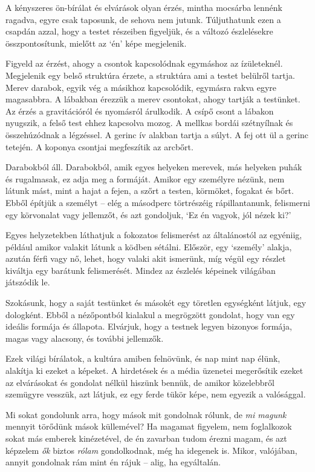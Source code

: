 A kényszeres ön-bírálat és elvárások olyan érzés, mintha mocsárba
lennénk ragadva, egyre csak taposunk, de sehova nem jutunk. Túljuthatunk
ezen a csapdán azzal, hogy a testet részeiben figyeljük, és a változó
észlelésekre összpontosítunk, mielőtt az `én' képe megjelenik.

Figyeld az érzést, ahogy a csontok kapcsolódnak egymáshoz az
ízületeknél. Megjelenik egy belső struktúra érzete, a struktúra ami a
testet belülről tartja. Merev darabok, egyik vég a másikhoz kapcsolódik,
egymásra rakva egyre magasabbra. A lábakban érezzük a merev csontokat,
ahogy tartják a testünket. Az érzés a gravitációról és nyomásról
árulkodik. A csípő csont a lábakon nyugszik, a felső test ehhez
kapcsolva mozog. A mellkas bordái szétnyílnak és összehúzódnak a
légzéssel. A gerinc ív alakban tartja a súlyt. A fej ott ül a gerinc
tetején. A koponya csontjai megfeszítik az arcbőrt.

Darabokból áll. Darabokból, amik egyes helyeken merevek, más helyeken
puhák és rugalmasak, ez adja meg a formáját. Amikor egy személyre
nézünk, nem látunk mást, mint a hajat a fejen, a szőrt a testen,
körmöket, fogakat és bőrt. Ebből építjük a személyt -- elég a másodperc
törtrészéig rápillantanunk, felismerni egy körvonalat vagy jellemzőt, és
azt gondoljuk, `Ez én vagyok, jól nézek ki?'

Egyes helyzetekben láthatjuk a fokozatos felismerést az általánostól az
egyéniig, például amikor valakit látunk a ködben sétálni. Először, egy
`személy' alakja, azután férfi vagy nő, lehet, hogy valaki akit
ismerünk, míg végül egy részlet kiváltja egy barátunk felismerését.
Mindez az észlelés képeinek világában játszódik le.

Szokásunk, hogy a saját testünket és másokét egy töretlen egységként
látjuk, egy dologként. Ebből a nézőpontból kialakul a megrögzött
gondolat, hogy van egy ideális formája és állapota. Elvárjuk, hogy a
testnek legyen bizonyos formája, magas vagy alacsony, és további
jellemzők.

Ezek világi bírálatok, a kultúra amiben felnövünk, és nap mint nap
élünk, alakítja ki ezeket a képeket. A hirdetések és a média üzenetei
megerősítik ezeket az elvárásokat és gondolat nélkül hiszünk bennük, de
amikor közelebbről szemügyre vesszük, azt látjuk, ez egy ferde tükör
képe, nem egyezik a valósággal.

Mi sokat gondolunk arra, hogy mások mit gondolnak rólunk, de \emph{mi
magunk} mennyit törődünk mások küllemével? Ha magamat figyelem, nem
foglalkozok sokat más emberek kinézetével, de én zavarban tudom érezni
magam, és azt képzelem \emph{ők} biztos \emph{rólam} gondolkodnak, még
ha idegenek is. Mikor, valójában, annyit gondolnak rám mint én rájuk --
alig, ha egyáltalán.

